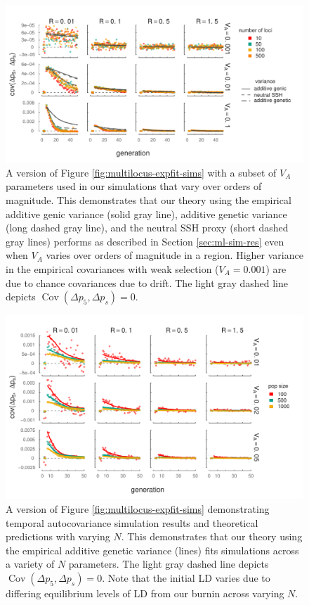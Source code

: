 \documentclass[11pt]{article}
\DeclareMathOperator{\cov}{Cov}
\begin{document}
\begin{figure}[!ht]
  \centering
  \includegraphics{./images/sim-pred-covs-varyl-va-oom.pdf}

  \caption{A version of Figure \ref{fig:multilocus-expfit-sims} with a subset
    of $V_A$ parameters used in our simulations that vary over orders of
    magnitude. This demonstrates that our theory using the empirical additive
    genic variance (solid gray line), additive genetic variance (long dashed
    gray line), and the neutral SSH proxy (short dashed gray lines) performs as
    described in Section \ref{sec:ml-sim-res} even when $V_A$ varies over
    orders of magnitude in a region. Higher variance in the empirical
    covariances with weak selection ($V_A = 0.001$) are due to chance covariances
    due to drift. The light gray dashed line depicts $\cov(\Delta p_5, \Delta p_s) =
  0$.}
  

  \label{fig:multilocus-expfit-sims-va-oom}
\end{figure}

\begin{figure}[!ht]
  \centering
  \includegraphics{./images/sim-pred-covs-varyn.pdf}

  \caption{A version of Figure \ref{fig:multilocus-expfit-sims} demonstrating
    temporal autocovariance simulation results and theoretical predictions with
    varying $N$. This demonstrates that our theory using the empirical additive
    genetic variance (lines) fits simulations across a variety of $N$
    parameters.  The light gray dashed line depicts $\cov(\Delta p_5, \Delta p_s) =
  0$. Note that the initial LD varies due to differing equilibrium levels of
LD from our burnin across varying $N$.}

  \label{fig:multilocus-expfit-sims-varyn}
\end{figure}
\end{document}

